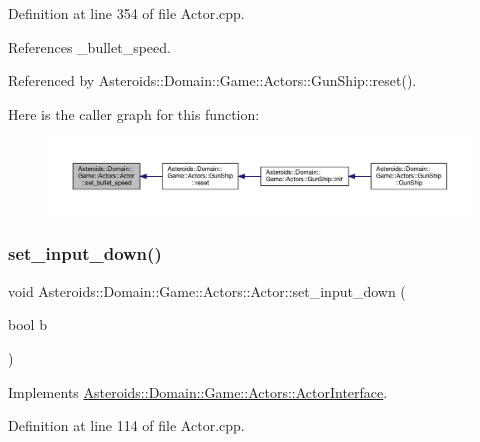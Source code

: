 Definition at line 354 of file Actor.\+cpp.



References \+\_\+bullet\+\_\+speed.



Referenced by Asteroids\+::\+Domain\+::\+Game\+::\+Actors\+::\+Gun\+Ship\+::reset().

Here is the caller graph for this function\+:\nopagebreak
\begin{figure}[H]
\begin{center}
\leavevmode
\includegraphics[width=350pt]{classAsteroids_1_1Domain_1_1Game_1_1Actors_1_1Actor_a4dddef94a025aca35e8592aa3aac71e5_icgraph}
\end{center}
\end{figure}
\mbox{\label{classAsteroids_1_1Domain_1_1Game_1_1Actors_1_1Actor_a6e0b2bd1eb20d224a527963e5bc035e4}} 
\subsubsection{\texorpdfstring{set\+\_\+input\+\_\+down()}{set\_input\_down()}}
{\footnotesize\ttfamily void Asteroids\+::\+Domain\+::\+Game\+::\+Actors\+::\+Actor\+::set\+\_\+input\+\_\+down (\begin{DoxyParamCaption}\item[{bool}]{b }\end{DoxyParamCaption})\hspace{0.3cm}{\ttfamily [virtual]}}



Implements \hyperlink{classAsteroids_1_1Domain_1_1Game_1_1Actors_1_1ActorInterface_acbc674bab36afc9b6851a401b7b0cfe5}{Asteroids\+::\+Domain\+::\+Game\+::\+Actors\+::\+Actor\+Interface}.



Definition at line 114 of file Actor.\+cpp.



